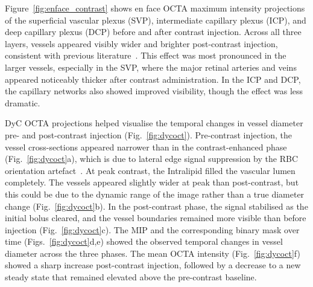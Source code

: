 Figure~\ref{fig:enface_contrast} shows en face OCTA maximum intensity projections of the superficial vascular plexus (SVP), intermediate capillary plexus (ICP), and deep capillary plexus (DCP) before and after contrast injection. Across all three layers, vessels appeared visibly wider and brighter post-contrast injection, consistent with previous literature~\cite{merkleHighresolutionDepthresolvedVascular2021}. This effect was most pronounced in the larger vessels, especially in the SVP, where the major retinal arteries and veins appeared noticeably thicker after contrast administration. In the ICP and DCP, the capillary networks also showed improved visibility, though the effect was less dramatic.

DyC OCTA projections helped visualise the temporal changes in vessel diameter pre- and post-contrast injection (Fig.~\ref{fig:dycoct}). Pre-contrast injection, the vessel cross-sections appeared narrower than in the contrast-enhanced phase (Fig.~\ref{fig:dycoct}a), which is due to lateral edge signal suppression by the RBC orientation artefact~\cite{bernucciInvestigationArtifactsRetinal2018}. At peak contrast, the Intralipid filled the vascular lumen completely. The vessels appeared slightly wider at peak than post-contrast, but this could be due to the dynamic range of the image rather than a true diameter change (Fig.~\ref{fig:dycoct}b). In the post-contrast phase, the signal stabilised as the initial bolus cleared, and the vessel boundaries remained more visible than before injection (Fig.~\ref{fig:dycoct}c). The MIP and the corresponding binary mask over time (Figs.~\ref{fig:dycoct}d,e) showed the observed temporal changes in vessel diameter across the three phases. The mean OCTA intensity (Fig.~\ref{fig:dycoct}f) showed a sharp increase post-contrast injection, followed by a decrease to a new steady state that remained elevated above the pre-contrast baseline. 

